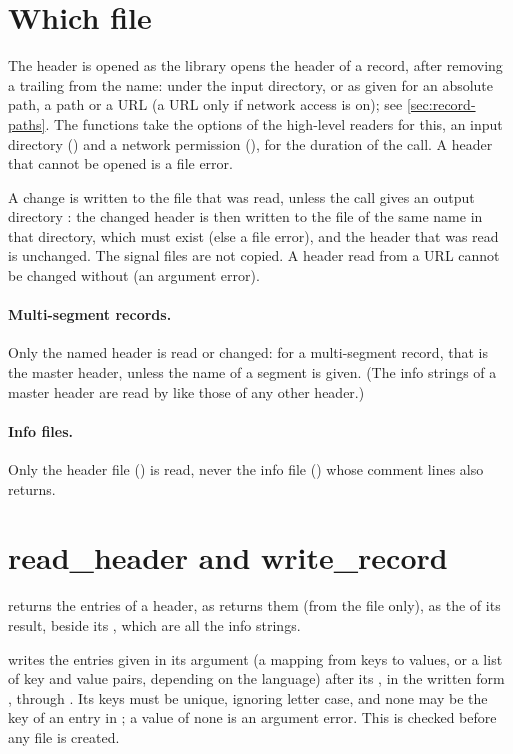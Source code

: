 \section{Which file}
\label{sec:metadata-file}

The header is opened as the library opens the header of a record, after
removing a trailing  from the name: under the input directory, or
as given for an absolute path, a \code{\textasciitilde} path or a URL (a URL
only if network access is on); see \cref{sec:record-paths}. The functions
take the options of the high-level readers for this, an input directory
() and a network permission (), for the
duration of the call. A header that cannot be opened is a file error.

A change is written to the file that was read, unless the call gives an
output directory : the changed header is then written to the file
of the same name in that directory, which must exist (else a file error),
and the header that was read is unchanged. The signal files are not copied.
A header read from a URL cannot be changed without  (an argument
error).

\paragraph{Multi-segment records.} Only the named header is read or
changed: for a multi-segment record, that is the master header, unless the
name of a segment is given. (The info strings of a master header are read by
 like those of any other header.)

\paragraph{Info files.} Only the header file () is read, never
the info file () whose comment lines  also
returns.

\section{read\_header and write\_record}
\label{sec:metadata-header}

 returns the entries of a header, as 
returns them (from the  file only), as the  of its
result, beside its , which are all the info strings.

 writes the entries given in its 
argument (a mapping from keys to values, or a list of key and value pairs,
depending on the language) after its , in the written form
, through . Its keys must be unique,
ignoring letter case, and none may be the key of an entry in
; a value of none is an argument error. This is checked
before any file is created.

